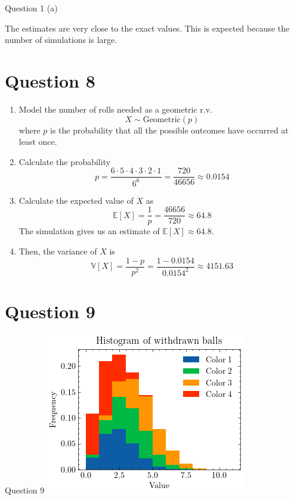 \documentclass[compress,12pt]{beamer}
\begin{document}
\begin{frame}{Question 1 (a)}
\begin{frame}
{\color{red}The estimates are very close to the exact values.} This is expected because the number of simulations is large.
\end{frame}

\section{Question 8}

\begin{frame}
    \begin{enumerate}
        \item Model the number of rolls needed as a geometric r.v.
        \[
         X \sim \text{Geometric}(p)
         \]
         where $p$ is the probability that all the possible outcomes have occurred at least once. 
        \item Calculate the probability \[
        p = \frac{6 \cdot 5 \cdot 4 \cdot 3 \cdot 2 \cdot 1}{6^6} = \frac{720}{46656} \approx 0.0154
         \]
        \item Calculate the expected value of $X$ as
        \[
        \mathbb{E}[X] = \frac{1}{p} = \frac{46656}{720} \approx 64.8
        \]
         The simulation gives us an estimate of $\mathbb{E}[X] \approx 64.8$. 
        \item Then, the variance of $X$ is\[
        \mathbb{V}[X] = \frac{1 - p}{p^2} = \frac{1 - 0.0154}{0.0154^2} \approx 4151.63
         \]
    \end{enumerate}

\end{frame}

\section{Question 9}
\begin{frame}{Question 9}
\centering
\includegraphics[scale=0.3]{imgs/balls.png}  
\end{frame}


\end{frame}
\end{document}

